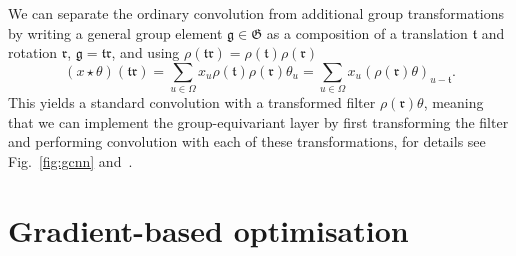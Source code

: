 We can separate the ordinary convolution from additional group transformations by writing a general group element $\mathfrak{g} \in \mathfrak{G}$ as a composition of a translation $\mathfrak{t}$ and rotation $\mathfrak{r}$, $\mathfrak g = \mathfrak{tr}$, and using  $\rho(\mathfrak{t r})=\rho(\mathfrak{t}) \rho(\mathfrak{r})$
\begin{equation}
	(x \star \theta)(\mathfrak{t r}) =\sum_{u \in \Omega} x_{u} \rho(\mathfrak{t}) \rho(\mathfrak{r}) \theta_{u} =\sum_{u \in \Omega} x_{u}(\rho(\mathfrak{r}) \theta)_{u-\mathfrak{t}}.
\end{equation}
This yields a standard convolution with a transformed filter $\rho(\mathfrak{r})\theta$, meaning that we can implement the group-equivariant layer by first transforming the filter and performing convolution with each of these transformations, for details see Fig.~\ref{fig:gcnn} and~\cite{cohen2016group}.

\section{Gradient-based optimisation}
\label{sec:gbopt}

